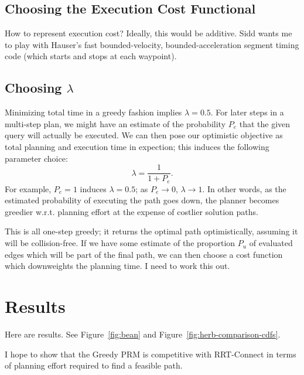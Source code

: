 \subsection{Choosing the Execution Cost Functional}

How to represent execution cost?
Ideally, this would be additive.
Sidd wants me to play with Hauser's fast bounded-velocity,
bounded-acceleration segment timing code
(which starts and stops at each waypoint).

\subsection{Choosing $\lambda$}

Minimizing total time in a greedy fashion implies $\lambda = 0.5$.
For later steps in a multi-step plan,
we might have an estimate of the probability $P_e$ that the given query will
actually be executed.
We can then pose our optimistic objective as total planning and execution
time in expection;
this induces the following parameter choice:
\begin{equation}
   \lambda = \frac{1}{1 + P_e} .
\end{equation}
For example, $P_e=1$ induces $\lambda = 0.5$;
as $P_e \rightarrow 0$, $\lambda \rightarrow 1$.
In other words,
as the estimated probability of executing the path goes down,
the planner becomes greedier w.r.t. planning effort at the expense of
costlier solution paths.

This is all one-step greedy;
it returns the optimal path optimistically,
assuming it will be collision-free.
If we have some estimate of the proportion $P_u$ of evaluated edges
which will be part of the final path,
we can then choose a cost function which downweights the planning time.
I need to work this out.

\section{Results}

Here are results.
See Figure~\ref{fig:bean} and Figure~\ref{fig:herb-comparison-cdfs}.

I hope to show that the Greedy PRM is competitive with RRT-Connect
in terms of planning effort required to find a feasible path.


